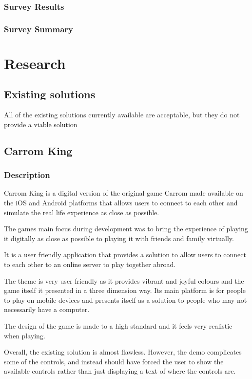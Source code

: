 \documentclass[11pt,a4paper]{report}
\begin{document}
\subsubsection{Survey Results}



\subsubsection{Survey Summary}



\section{Research}

\subsection{Existing solutions}
All of the existing solutions currently available are acceptable, but they do not provide a viable solution

\subsection{Carrom King}
\subsubsection{Description}
Carrom King is a digital version of the original game Carrom made available on the iOS and Android platforms that allows users to connect to each other and simulate the real life experience as close as possible.

The games main focus during development was to bring the experience of playing it digitally as close as possible to playing it with friends and family virtually.

It is a user friendly application that provides a solution to allow users to connect to each other to an online server to play together abroad.

The theme is very user friendly as it provides vibrant and joyful colours and the game itself it presented in a three dimension way. Its main platform is for people to play on mobile devices and presents itself as a solution to people who may not necessarily have a computer.

The design of the game is made to a high standard and it feels very realistic when playing.

Overall, the existing solution is almost flawless.
However, the demo complicates some of the controls, and instead should have forced the user to show the available controls rather than just displaying a text of where the controls are.
\end{document}
